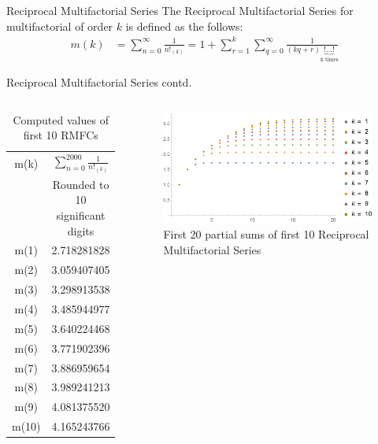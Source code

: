 \documentclass{beamer}
\begin{document}
\begin{frame}{Reciprocal Multifactorial Series}
    The Reciprocal Multifactorial Series for multifactorial of order $k$ is defined as the follows:
\begin{align}
    m(k)&=\sum_{n=0}^{\infty}\frac{1}{n!_{(k)}}=1+\sum_{r=1}^{k}\sum_{q=0}^{\infty}\frac{1}{(kq+r)\underbrace{!\dots!}_{\text{k times}}}
\end{align}
\end{frame}
\begin{frame}{Reciprocal Multifactorial Series contd.}
    \begin{columns}
			\begin{table}[]
			\tiny
\centering
\begin{tabular}{@{}cc@{}}
\toprule
m(k) & $\sum_{n=0}^{2000}\frac{1}{n!_{(k)}}$  \\ & Rounded to 10 significant digits \\ \midrule
m(1) & 2.718281828 \\
m(2) & 3.059407405 \\
m(3) & 3.298913538 \\
m(4) & 3.485944977 \\
m(5) & 3.640224468 \\
m(6) & 3.771902396 \\
m(7) & 3.886959654 \\
m(8) & 3.989241213 \\
m(9) & 4.081375520 \\
m(10) & 4.165243766 \\ \bottomrule
\end{tabular}
\caption{\small Computed values of first 10 RMFCs \cite{oeis}}
\label{tab:summationvalues}
\end{table}
		
			\begin{figure}[!htp]
    \centering
    \includegraphics[width=\linewidth]{Images/first20partialfractions.png}
    \caption{First 20 partial sums of first 10 Reciprocal Multifactorial Series}
    \label{fig:50partialsums}
\end{figure}
	\end{columns}
\end{frame}
\end{document}
